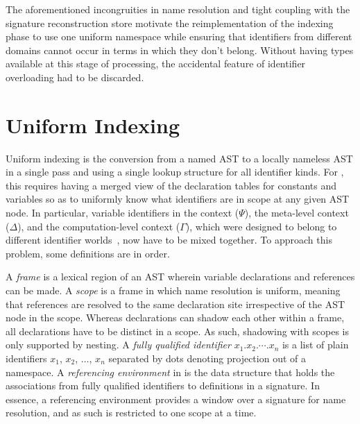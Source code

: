 The aforementioned incongruities in name resolution and tight coupling with the signature reconstruction store motivate the reimplementation of the indexing phase to use one uniform namespace while ensuring that identifiers from different domains cannot occur in terms in which they don't belong.
Without having types available at this stage of processing, the accidental feature of identifier overloading had to be discarded.

\section{Uniform Indexing}\label{section:indexing}


Uniform indexing is the conversion from a named \ac{AST} to a locally nameless \ac{AST} in a single pass and using a single lookup structure for all identifier kinds.
For \Beluga, this requires having a merged view of the declaration tables for constants and variables so as to uniformly know what identifiers are in scope at any given \ac{AST} node.
In particular, variable identifiers in the \LF context ($\Psi$), the meta-level context ($\Delta$), and the computation-level context ($\Gamma$), which were designed to belong to different identifier worlds~\cite{ferreira2012compiler}, now have to be mixed together.
To approach this problem, some definitions are in order.


A \textit{frame} is a lexical region of an \ac{AST} wherein variable declarations and references can be made.
A \textit{scope} is a frame in which name resolution is uniform, meaning that references are resolved to the same declaration site irrespective of the \ac{AST} node in the scope.
Whereas declarations can shadow each other within a frame, all declarations have to be distinct in a scope.
As such, shadowing with scopes is only supported by nesting.
A \textit{fully qualified identifier} $x_1.x_2.\cdots.x_n$ is a list of plain identifiers $x_1$, $x_2$, $\dots$, $x_n$ separated by dots denoting projection out of a namespace.
A \textit{referencing environment} in \Beluga is the data structure that holds the associations from fully qualified identifiers to definitions in a signature.
In essence, a referencing environment provides a window over a signature for name resolution, and as such is restricted to one scope at a time.

